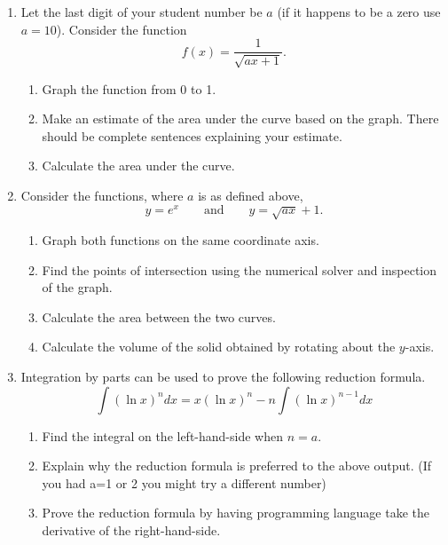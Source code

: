 \documentclass[11pt]{article}
\begin{document}
\begin{enumerate}
\item Let the last digit of your student number be $a$ (if it happens to be a zero use $a=10$).  Consider the function 
\[f(x)=\frac1{\sqrt{ax+1}}.\]
\begin{enumerate}
\item Graph the function from 0 to 1.
\item Make an estimate of the area under the curve based on the graph.  There should be complete sentences explaining your estimate.
\item Calculate the area under the curve.
\end{enumerate}
\item Consider the functions, where $a$ is as defined above,
\[
y= e^{x}\quad\quad\text{and}\quad\quad y=\sqrt{a x}+1.
\]
\begin{enumerate}
\item Graph both functions on the same coordinate axis.
\item Find the points of intersection using the numerical solver and inspection of the graph.
\item Calculate the area between the two curves.
\item Calculate the volume of the solid obtained by rotating about the $y$-axis.
\end{enumerate}
\item Integration by parts can be used to prove the following reduction formula.
\[
\int \left(\ln x\right)^n dx=x\left(\ln x\right)^n-n\int\left(\ln x \right)^{n-1} dx
\]
\begin{enumerate}
\item Find the integral on the left-hand-side when $n=a$.
\item Explain why the reduction formula is preferred to the above output.  (If you had a=1 or 2 you might try a different number)
\item Prove the reduction formula by having programming language take the derivative of the right-hand-side.
\end{enumerate}
\end{enumerate}
\end{document}
